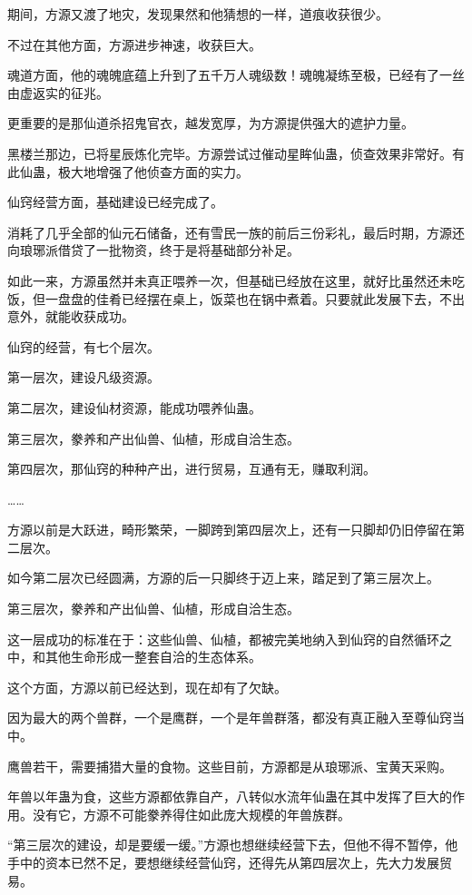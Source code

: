 \begin{this_body}
期间，方源又渡了地灾，发现果然和他猜想的一样，道痕收获很少。

不过在其他方面，方源进步神速，收获巨大。

魂道方面，他的魂魄底蕴上升到了五千万人魂级数！魂魄凝练至极，已经有了一丝由虚返实的征兆。

更重要的是那仙道杀招鬼官衣，越发宽厚，为方源提供强大的遮护力量。

黑楼兰那边，已将星辰炼化完毕。方源尝试过催动星眸仙蛊，侦查效果非常好。有此仙蛊，极大地增强了他侦查方面的实力。

仙窍经营方面，基础建设已经完成了。

消耗了几乎全部的仙元石储备，还有雪民一族的前后三份彩礼，最后时期，方源还向琅琊派借贷了一批物资，终于是将基础部分补足。

如此一来，方源虽然并未真正喂养一次，但基础已经放在这里，就好比虽然还未吃饭，但一盘盘的佳肴已经摆在桌上，饭菜也在锅中煮着。只要就此发展下去，不出意外，就能收获成功。

仙窍的经营，有七个层次。

第一层次，建设凡级资源。

第二层次，建设仙材资源，能成功喂养仙蛊。

第三层次，豢养和产出仙兽、仙植，形成自洽生态。

第四层次，那仙窍的种种产出，进行贸易，互通有无，赚取利润。

……

方源以前是大跃进，畸形繁荣，一脚跨到第四层次上，还有一只脚却仍旧停留在第二层次。

如今第二层次已经圆满，方源的后一只脚终于迈上来，踏足到了第三层次上。

第三层次，豢养和产出仙兽、仙植，形成自洽生态。

这一层成功的标准在于：这些仙兽、仙植，都被完美地纳入到仙窍的自然循环之中，和其他生命形成一整套自洽的生态体系。

这个方面，方源以前已经达到，现在却有了欠缺。

因为最大的两个兽群，一个是鹰群，一个是年兽群落，都没有真正融入至尊仙窍当中。

鹰兽若干，需要捕猎大量的食物。这些目前，方源都是从琅琊派、宝黄天采购。

年兽以年蛊为食，这些方源都依靠自产，八转似水流年仙蛊在其中发挥了巨大的作用。没有它，方源不可能豢养得住如此庞大规模的年兽族群。

“第三层次的建设，却是要缓一缓。”方源也想继续经营下去，但他不得不暂停，他手中的资本已然不足，要想继续经营仙窍，还得先从第四层次上，先大力发展贸易。


\end{this_body}
